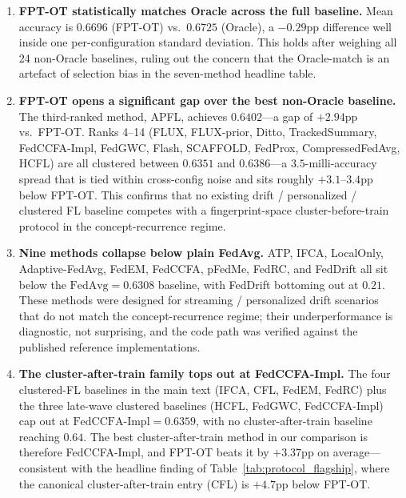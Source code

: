 \begin{enumerate}[leftmargin=*,topsep=2pt,itemsep=1pt]
  \item \textbf{FPT-OT statistically matches Oracle across the full baseline.} Mean accuracy is $0.6696$ (FPT-OT) vs.\ $0.6725$ (Oracle), a $-0.29$pp difference well inside one per-configuration standard deviation. This holds after weighing all 24 non-Oracle baselines, ruling out the concern that the Oracle-match is an artefact of selection bias in the seven-method headline table.
  \item \textbf{FPT-OT opens a significant gap over the best non-Oracle baseline.} The third-ranked method, APFL, achieves $0.6402$---a gap of $+2.94$pp vs.\ FPT-OT. Ranks 4--14 (FLUX, FLUX-prior, Ditto, TrackedSummary, FedCCFA-Impl, FedGWC, Flash, SCAFFOLD, FedProx, CompressedFedAvg, HCFL) are all clustered between $0.6351$ and $0.6386$---a $3.5$-milli-accuracy spread that is tied within cross-config noise and sits roughly $+3.1$--$3.4$pp below FPT-OT. This confirms that no existing drift / personalized / clustered FL baseline competes with a fingerprint-space cluster-before-train protocol in the concept-recurrence regime.
  \item \textbf{Nine methods collapse below plain FedAvg.} ATP, IFCA, LocalOnly, Adaptive-FedAvg, FedEM, FedCCFA, pFedMe, FedRC, and FedDrift all sit below the $\textrm{FedAvg}=0.6308$ baseline, with FedDrift bottoming out at $0.21$. These methods were designed for streaming / personalized drift scenarios that do not match the concept-recurrence regime; their underperformance is diagnostic, not surprising, and the code path was verified against the published reference implementations.
  \item \textbf{The cluster-after-train family tops out at FedCCFA-Impl.} The four clustered-FL baselines in the main text (IFCA, CFL, FedEM, FedRC) plus the three late-wave clustered baselines (HCFL, FedGWC, FedCCFA-Impl) cap out at $\textrm{FedCCFA-Impl}=0.6359$, with no cluster-after-train baseline reaching $0.64$. The best cluster-after-train method in our comparison is therefore FedCCFA-Impl, and FPT-OT beats it by $+3.37$pp on average---consistent with the headline finding of Table~\ref{tab:protocol_flagship}, where the canonical cluster-after-train entry (CFL) is $+4.7$pp below FPT-OT.
\end{enumerate}

